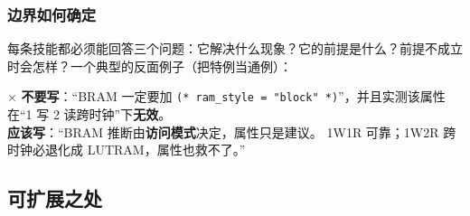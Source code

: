 \documentclass[withoutpreface,bwprint]{cumcmthesis}
\begin{document}
%

\subsubsection{边界如何确定}

每条技能都必须能回答三个问题：它解决什么现象？它的前提是什么？前提不成立时会怎样？一个典型的反面例子（把特例当通例）：

\begin{tcolorbox}[colback=red!3, colframe=red!40, breakable]
$\times$ \textbf{不要写}：“BRAM 一定要加 \texttt{(* ram\_style = "block" *)}”，并且实测该属性在“1 写 2 读跨时钟”下\textbf{无效}。\\
\checkmark\;\textbf{应该写}：“BRAM 推断由\textbf{访问模式}决定，属性只是建议。
1W1R 可靠；1W2R 跨时钟必退化成 LUTRAM，属性也救不了。”
\end{tcolorbox}

\subsection{可扩展之处}
\end{document}
